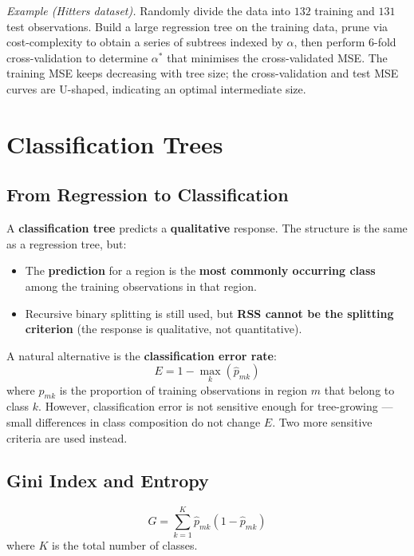 \documentclass[11pt,a4paper]{article}
\theoremstyle{definition}
\theoremstyle{plain}
\theoremstyle{remark}
\begin{document}
\textit{Example (Hitters dataset).} Randomly divide the data into $132$ training and $131$ test observations. Build a large regression tree on the training data, prune via cost-complexity to obtain a series of subtrees indexed by $\alpha$, then perform $6$-fold cross-validation to determine $\alpha^*$ that minimises the cross-validated MSE. The training MSE keeps decreasing with tree size; the cross-validation and test MSE curves are U-shaped, indicating an optimal intermediate size.


\section{Classification Trees}

\subsection{From Regression to Classification}

A \textbf{classification tree} predicts a \textbf{qualitative} response. The structure is the same as a regression tree, but:
\begin{itemize}
    \item The \textbf{prediction} for a region is the \textbf{most commonly occurring class} among the training observations in that region.
    \item Recursive binary splitting is still used, but \textbf{RSS cannot be the splitting criterion} (the response is qualitative, not quantitative).
\end{itemize}

A natural alternative is the \textbf{classification error rate}:
\[
    E = 1 - \max_k (\hat{p}_{mk})
\]
where $\hat{p}_{mk}$ is the proportion of training observations in region $m$ that belong to class $k$. However, classification error is not sensitive enough for tree-growing — small differences in class composition do not change $E$. Two more sensitive criteria are used instead.

\subsection{Gini Index and Entropy}

\begin{tcolorbox}[colback=blue!5!white,colframe=blue!75!black,title=\textbf{Gini Index}]
\[
    G = \sum_{k=1}^{K} \hat{p}_{mk} (1 - \hat{p}_{mk})
\]
where $K$ is the total number of classes.
\end{tcolorbox}
\end{document}
